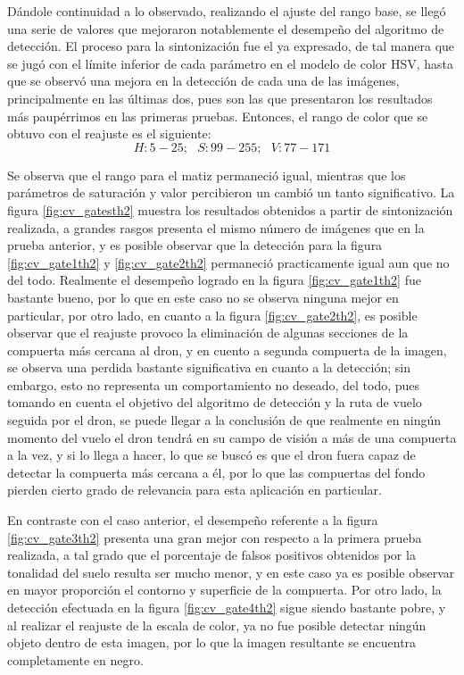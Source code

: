 Dándole continuidad a lo observado, realizando el ajuste del rango base, se llegó una serie de valores que mejoraron notablemente el desempeño del algoritmo de detección. El proceso para la sintonización fue el ya expresado, de tal manera que se jugó con el límite inferior de cada parámetro en el modelo de color HSV, hasta que se observó una mejora en la detección de cada una de las imágenes, principalmente en las últimas dos, pues son las que presentaron los resultados más paupérrimos en las primeras pruebas. Entonces, el rango de color que se obtuvo con el reajuste es el siguiente: \[H:5-25;\text{ } S:99-255;\text{ } V:77-171\]

Se observa que el rango para el matiz permaneció igual, mientras que los parámetros de saturación y valor percibieron un cambió un tanto significativo. La figura \ref{fig:cv_gatesth2} muestra los resultados obtenidos a partir de sintonización realizada, a grandes rasgos presenta el mismo número de imágenes que en la prueba anterior, y es posible observar que la detección para la figura \ref{fig:cv_gate1th2} y \ref{fig:cv_gate2th2} permaneció practicamente igual aun que no del todo. Realmente el desempeño logrado en la figura \ref{fig:cv_gate1th2} fue bastante bueno, por lo que en este caso no se observa ninguna mejor en particular, por otro lado, en cuanto a la figura \ref{fig:cv_gate2th2}, es posible observar que el reajuste provoco la eliminación de algunas secciones de la compuerta más cercana al dron, y en cuento a segunda compuerta de la imagen, se observa una perdida bastante significativa en cuanto a la detección; sin embargo, esto no representa un comportamiento no deseado, del todo, pues tomando en cuenta el objetivo del algoritmo de detección y la ruta de vuelo seguida por el dron, se puede llegar a la conclusión de que realmente en ningún momento del vuelo el dron tendrá en su campo de visión a más de una compuerta a la vez, y si lo llega a hacer, lo que se buscó es que el dron fuera capaz de detectar la compuerta más cercana a él, por lo que las compuertas del fondo pierden cierto grado de relevancia para esta aplicación en particular. 

En contraste con el caso anterior, el desempeño referente a la figura \ref{fig:cv_gate3th2} presenta una gran mejor con respecto a la primera prueba realizada, a tal grado que el porcentaje de falsos positivos obtenidos por la tonalidad del suelo resulta ser mucho menor, y en este caso ya es posible observar en mayor proporción el contorno y superficie de la compuerta. Por otro lado, la detección efectuada en la figura \ref{fig:cv_gate4th2} sigue siendo bastante pobre, y al realizar el reajuste de la escala de color, ya no fue posible detectar ningún objeto dentro de esta imagen, por lo que la imagen resultante se encuentra completamente en negro.


